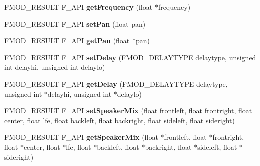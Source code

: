 \begin{DoxyCompactItemize}
\item 
\hypertarget{class_f_m_o_d_1_1_channel_a99f1dcf4b2a67f509d08f138e9e3cbca}{F\-M\-O\-D\-\_\-\-R\-E\-S\-U\-L\-T F\-\_\-\-A\-P\-I {\bfseries get\-Frequency} (float $\ast$frequency)}\label{class_f_m_o_d_1_1_channel_a99f1dcf4b2a67f509d08f138e9e3cbca}

\item 
\hypertarget{class_f_m_o_d_1_1_channel_a419235a572a267b0763287fe988435f7}{F\-M\-O\-D\-\_\-\-R\-E\-S\-U\-L\-T F\-\_\-\-A\-P\-I {\bfseries set\-Pan} (float pan)}\label{class_f_m_o_d_1_1_channel_a419235a572a267b0763287fe988435f7}

\item 
\hypertarget{class_f_m_o_d_1_1_channel_a776a9e6fbca132087663e77de052806c}{F\-M\-O\-D\-\_\-\-R\-E\-S\-U\-L\-T F\-\_\-\-A\-P\-I {\bfseries get\-Pan} (float $\ast$pan)}\label{class_f_m_o_d_1_1_channel_a776a9e6fbca132087663e77de052806c}

\item 
\hypertarget{class_f_m_o_d_1_1_channel_a21a2f9d9fdae503ce53a9ced9c4cb9a2}{F\-M\-O\-D\-\_\-\-R\-E\-S\-U\-L\-T F\-\_\-\-A\-P\-I {\bfseries set\-Delay} (F\-M\-O\-D\-\_\-\-D\-E\-L\-A\-Y\-T\-Y\-P\-E delaytype, unsigned int delayhi, unsigned int delaylo)}\label{class_f_m_o_d_1_1_channel_a21a2f9d9fdae503ce53a9ced9c4cb9a2}

\item 
\hypertarget{class_f_m_o_d_1_1_channel_a8cc8b51bc344dd7916628568764aa6cf}{F\-M\-O\-D\-\_\-\-R\-E\-S\-U\-L\-T F\-\_\-\-A\-P\-I {\bfseries get\-Delay} (F\-M\-O\-D\-\_\-\-D\-E\-L\-A\-Y\-T\-Y\-P\-E delaytype, unsigned int $\ast$delayhi, unsigned int $\ast$delaylo)}\label{class_f_m_o_d_1_1_channel_a8cc8b51bc344dd7916628568764aa6cf}

\item 
\hypertarget{class_f_m_o_d_1_1_channel_ad6b62bf51be6c5c3006e23717e8ad4c7}{F\-M\-O\-D\-\_\-\-R\-E\-S\-U\-L\-T F\-\_\-\-A\-P\-I {\bfseries set\-Speaker\-Mix} (float frontleft, float frontright, float center, float lfe, float backleft, float backright, float sideleft, float sideright)}\label{class_f_m_o_d_1_1_channel_ad6b62bf51be6c5c3006e23717e8ad4c7}

\item 
\hypertarget{class_f_m_o_d_1_1_channel_a1cec99c48524d8cbf6d4454b1ec7a374}{F\-M\-O\-D\-\_\-\-R\-E\-S\-U\-L\-T F\-\_\-\-A\-P\-I {\bfseries get\-Speaker\-Mix} (float $\ast$frontleft, float $\ast$frontright, float $\ast$center, float $\ast$lfe, float $\ast$backleft, float $\ast$backright, float $\ast$sideleft, float $\ast$sideright)}\label{class_f_m_o_d_1_1_channel_a1cec99c48524d8cbf6d4454b1ec7a374}


\end{DoxyCompactItemize}
